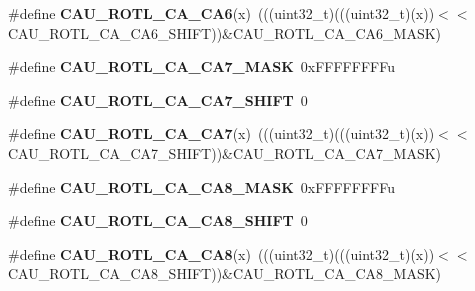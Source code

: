 \begin{DoxyCompactItemize}
\item 
\#define {\bfseries C\+A\+U\+\_\+\+R\+O\+T\+L\+\_\+\+C\+A\+\_\+\+C\+A6}(x)~(((uint32\+\_\+t)(((uint32\+\_\+t)(x))$<$$<$C\+A\+U\+\_\+\+R\+O\+T\+L\+\_\+\+C\+A\+\_\+\+C\+A6\+\_\+\+S\+H\+I\+FT))\&C\+A\+U\+\_\+\+R\+O\+T\+L\+\_\+\+C\+A\+\_\+\+C\+A6\+\_\+\+M\+A\+SK)\hypertarget{group__CAU__Register__Masks_ga28aed5ce2b04ab3e83f41f2b7652836c}{}\label{group__CAU__Register__Masks_ga28aed5ce2b04ab3e83f41f2b7652836c}

\item 
\#define {\bfseries C\+A\+U\+\_\+\+R\+O\+T\+L\+\_\+\+C\+A\+\_\+\+C\+A7\+\_\+\+M\+A\+SK}~0x\+F\+F\+F\+F\+F\+F\+F\+Fu\hypertarget{group__CAU__Register__Masks_gadd2dfc00072ea9bfc8693db4bdf349c0}{}\label{group__CAU__Register__Masks_gadd2dfc00072ea9bfc8693db4bdf349c0}

\item 
\#define {\bfseries C\+A\+U\+\_\+\+R\+O\+T\+L\+\_\+\+C\+A\+\_\+\+C\+A7\+\_\+\+S\+H\+I\+FT}~0\hypertarget{group__CAU__Register__Masks_ga6fc3bc4fdde8ba6f026800de3795b23f}{}\label{group__CAU__Register__Masks_ga6fc3bc4fdde8ba6f026800de3795b23f}

\item 
\#define {\bfseries C\+A\+U\+\_\+\+R\+O\+T\+L\+\_\+\+C\+A\+\_\+\+C\+A7}(x)~(((uint32\+\_\+t)(((uint32\+\_\+t)(x))$<$$<$C\+A\+U\+\_\+\+R\+O\+T\+L\+\_\+\+C\+A\+\_\+\+C\+A7\+\_\+\+S\+H\+I\+FT))\&C\+A\+U\+\_\+\+R\+O\+T\+L\+\_\+\+C\+A\+\_\+\+C\+A7\+\_\+\+M\+A\+SK)\hypertarget{group__CAU__Register__Masks_gaac333466a6b16549053da2d64b733f16}{}\label{group__CAU__Register__Masks_gaac333466a6b16549053da2d64b733f16}

\item 
\#define {\bfseries C\+A\+U\+\_\+\+R\+O\+T\+L\+\_\+\+C\+A\+\_\+\+C\+A8\+\_\+\+M\+A\+SK}~0x\+F\+F\+F\+F\+F\+F\+F\+Fu\hypertarget{group__CAU__Register__Masks_ga4453f2b5a0d2dd265cf121960804c8a7}{}\label{group__CAU__Register__Masks_ga4453f2b5a0d2dd265cf121960804c8a7}

\item 
\#define {\bfseries C\+A\+U\+\_\+\+R\+O\+T\+L\+\_\+\+C\+A\+\_\+\+C\+A8\+\_\+\+S\+H\+I\+FT}~0\hypertarget{group__CAU__Register__Masks_ga36c108071b9cf5eef7d56d3b6c5bfbf8}{}\label{group__CAU__Register__Masks_ga36c108071b9cf5eef7d56d3b6c5bfbf8}

\item 
\#define {\bfseries C\+A\+U\+\_\+\+R\+O\+T\+L\+\_\+\+C\+A\+\_\+\+C\+A8}(x)~(((uint32\+\_\+t)(((uint32\+\_\+t)(x))$<$$<$C\+A\+U\+\_\+\+R\+O\+T\+L\+\_\+\+C\+A\+\_\+\+C\+A8\+\_\+\+S\+H\+I\+FT))\&C\+A\+U\+\_\+\+R\+O\+T\+L\+\_\+\+C\+A\+\_\+\+C\+A8\+\_\+\+M\+A\+SK)\hypertarget{group__CAU__Register__Masks_gac4d27277c32faec31fb884c090e0766a}{}\label{group__CAU__Register__Masks_gac4d27277c32faec31fb884c090e0766a}


\end{DoxyCompactItemize}
